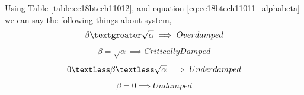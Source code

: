 \begin{enumerate}[label=\thesubsection.\arabic*.,ref=\thesubsection.\theenumi]
\solution Using Table \ref{table:ee18btech11012}, and equation \eqref{eq:ee18btech11011_alphabeta} we can say the following things about system,
\begin{align}
    \beta \textgreater \sqrt{\alpha} \implies Overdamped
\end{align}
\begin{align}
    \beta = \sqrt{\alpha} \implies Critically Damped
\end{align}
\begin{align}
    0  \textless  \beta \textless \sqrt{\alpha} \implies Underdamped
\end{align}
\begin{align}
    \beta = 0 \implies Undamped
\end{align}

\end{enumerate}



